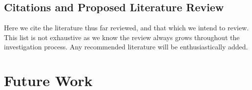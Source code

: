 \documentclass{article}
\begin{document}


\subsection{Citations and Proposed Literature Review}

Here we cite the literature thus far reviewed, and that which we intend to review. This list is not exhaustive as we know the review always grows throughout the investigation process. Any recommended literature will be enthusiastically added.

\nocite{*}




\section{Future Work}


\end{document}

